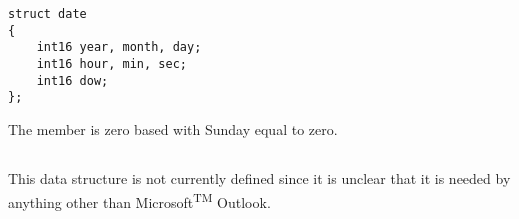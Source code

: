 \documentclass{article}
\begin{document}
\begin{verbatim}
struct date
{
    int16 year, month, day;
    int16 hour, min, sec;
    int16 dow;
};
\end{verbatim}

The  member is zero based with Sunday equal to zero.

\subsection{}

This data structure is not currently defined since it is unclear that it is
needed by anything other than Microsoft\textsuperscript{TM} Outlook.
\end{document}
